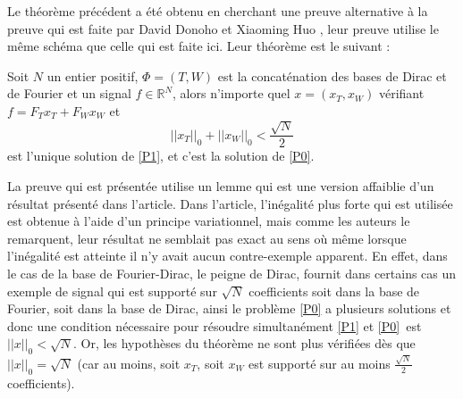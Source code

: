 \begin{remarque}
	Le théorème précédent a été obtenu en cherchant une preuve alternative à la preuve qui est faite par David Donoho et Xiaoming Huo \cite{DonohoHuo}, leur preuve utilise le même schéma que celle qui est faite ici.
	Leur théorème est le suivant :
\begin{theoreme}
	Soit $N$ un entier positif, $\Phi = (T, W)$ est la concaténation des bases de Dirac et de Fourier et un signal $f\in \mathbb{R}^N$, alors n'importe quel $x = (x_T, x_W)$ vérifiant $f = F_T x_T + F_W x_W$ et
	\begin{equation}
		||x_T||_0 +  ||x_W||_0 < \frac{\sqrt{N}}{2}
	\end{equation}
	est l'unique solution de \ref{P1}, et c'est la solution de \ref{P0}.
\end{theoreme}
	La preuve qui est présentée utilise un lemme qui est une version affaiblie d'un résultat présenté dans l'article.
	Dans l'article, l'inégalité plus forte qui est utilisée est obtenue à l'aide d'un principe variationnel, mais comme les auteurs le remarquent, leur résultat ne semblait pas exact au sens où même lorsque l'inégalité est atteinte il n'y avait aucun contre-exemple apparent.
	En effet, dans le cas de la base de Fourier-Dirac, le peigne de Dirac, fournit dans certains cas un exemple de signal qui est supporté sur $\sqrt{N}$ coefficients soit dans la base de Fourier, soit dans la base de Dirac, ainsi le problème \ref{P0} a plusieurs solutions et donc une condition nécessaire pour résoudre simultanément \ref{P1} et \ref{P0} est $||x||_0 < \sqrt{N}$.
	Or, les hypothèses du théorème ne sont plus vérifiées dès que $||x||_0 = \sqrt{N}$ (car au moins, soit $x_T$, soit $x_W$ est supporté sur au moins $\frac{\sqrt{N}}{2}$ coefficients). 
\end{remarque}
